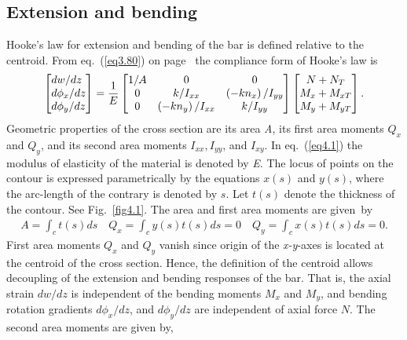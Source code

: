\documentclass{AeroStructure-ERJohnson}
\begin{document}
\subsection{Extension and bending}\label{sec4.1.1}

Hooke's law for extension and bending of the bar is defined relative
to the centroid. From eq.~(\ref{eq3.80}) on page~\pageref{eq3.80} the compliance form of Hooke's law is
\begin{align}\label{eq4.1}
\left[\begin{array}{@{}l@{}}d w/d z \\d \phi_{x}/d z \\d \phi_{y}/d z\end{array}\right]=\frac{1}{E}\left[\begin{array}{@{}ccc@{}}1/A & 0 & 0 \\0 & k/I_{x x} & \left(-k n_{x}\right)/I_{y y} \\0 & \left(-k n_{y}\right)/I_{x x} & k/I_{y y}\end{array}\right]\left[\begin{array}{@{}c@{}}N+N_{T} \\M_{x}+M_{x T} \\M_{y}+M_{y T}\end{array}\right].
\end{align}
Geometric properties of the cross section are its area \textit{A}, its first area moments $Q_{x}$ and $Q_{y}$, and its second area moments $I_{xx}, I_{yy}$, and $I_{xy}$. In eq.~(\ref{eq4.1}) the modulus of elasticity of the material is denoted by \textit{E}. The locus of points on the contour is expressed parametrically by the equations $x(s)$ and $y(s)$, where the arc-length of the contrary is denoted by $s$. Let $t(s)$ denote the thickness of the contour. See Fig.~\ref{fig4.1}. The area and first area moments are given~\vspace*{4pt}by\pagebreak
\begin{align}\label{eq4.2}
A=\int_{c} t(s) d s \quad Q_{x}=\int_{c} y(s) t(s) d s=0 \quad Q_{y}=\int_{c} x(s) t(s) d s=0.
\end{align}
First area moments $Q_{x}$ and $Q_{y}$ vanish since origin of the \textit{x-y}-axes is located at the centroid of the cross section. Hence, the definition of the centroid allows decoupling of the extension and bending responses of the bar. That is, the axial strain $d w/d z$ is independent of the bending moments $M_{x}$ and $M_{y}$, and bending rotation gradients $d \phi_{x}/d z$, and $d \phi_{y}/d z$ are independent of axial force $N$. The second area moments are given by,
\end{document}
